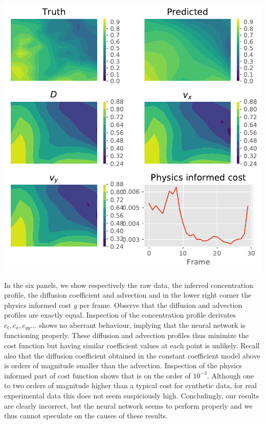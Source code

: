\documentclass{Dissertate}
\let\origfigure\figure
\let\endorigfigure\endfigure
\renewenvironment{figure}[1][2] {
    \expandafter\origfigure\expandafter[H]
} {
    \endorigfigure
}
\begin{document}
\begin{figure}
\hypertarget{fig:nnfull}{%
\centering
\includegraphics{source/figures/pdf/NN_Man_full.pdf}
\caption{We show the raw data, inferred concentration, diffusion and advection fields and the physics informed cost as a function of the frames.}\label{fig:nnfull}
}
\end{figure}

In the six panels, we show respectively the raw data, the inferred
concentration profile, the diffusion coefficient and advection and in
the lower right corner the physics informed cost \(g\) per frame.
Observe that the diffusion and advection profiles are exactly equal.
Inspection of the concentration profile derivates
\(c_t, c_x, c_{yy}...\) shows no aberrant behaviour, implying that the
neural network is functioning properly. These diffusion and advection
profiles thus minimize the cost function but having similar coefficient
values at each point is unlikely. Recall also that the diffusion
coefficient obtained in the constant coefficient model above is orders of
magnitude smaller than the advection. Inspection of the physics informed
part of cost function shows that is on the order of \(10^{-3}\).
Although one to two orders of magnitude higher than a typical cost for synthetic data, for
real experimental data this does not seem suspiciously high. Concludingly, our results are clearly incorrect, but the neural network seems to
perform properly and we thus cannot speculate on the causes of these results.
\end{document}
